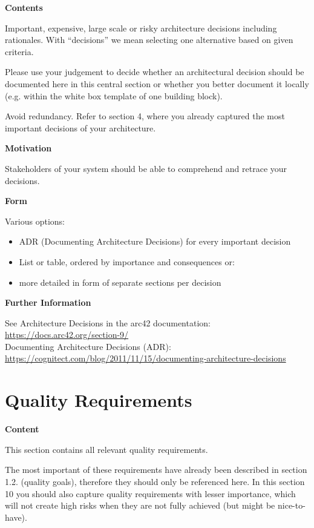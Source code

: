 \documentclass[12pt,a4paper]{article}
\newcommand{\minititle}[1]{%
  \par\addvspace{0.6\baselineskip}%
  \noindent\textbf{#1}\par\nobreak%
  \noindent\ignorespaces%
}
\begin{document}
\minititle{Contents}
Important, expensive, large scale or risky architecture decisions including rationales. With ``decisions'' we mean selecting one alternative based on given criteria.

Please use your judgement to decide whether an architectural decision should be documented here in this central section or whether you better document it locally (e.g. within the white box template of one building block).

Avoid redundancy. Refer to section 4, where you already captured the most important decisions of your architecture.

\minititle{Motivation}
Stakeholders of your system should be able to comprehend and retrace your decisions.

\minititle{Form}
Various options:
\begin{itemize}
  \item ADR (Documenting Architecture Decisions) for every important decision
  \item List or table, ordered by importance and consequences or:
  \item more detailed in form of separate sections per decision
\end{itemize}


\minititle{Further Information}
See Architecture Decisions in the arc42 documentation:
\href{https://docs.arc42.org/section-9/}{https://docs.arc42.org/section-9/}\\
Documenting Architecture Decisions (ADR):\\
\href{https://cognitect.com/blog/2011/11/15/documenting-architecture-decisions}{https://cognitect.com/blog/2011/11/15/documenting-architecture-decisions}

\section{Quality Requirements}

\minititle{Content}
This section contains all relevant quality requirements.

The most important of these requirements have already been described in section 1.2. (quality goals), therefore they should only be referenced here. In this section 10 you should also capture quality requirements with lesser importance, which will not create high risks when they are not fully achieved (but might be nice-to-have).
\end{document}
